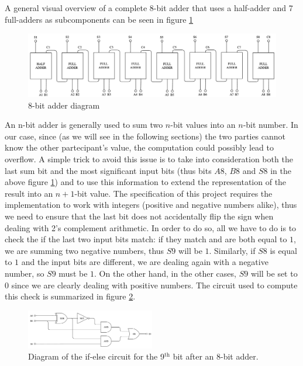\documentclass[12pt]{article}
\begin{document}
A general visual overview of a complete 8-bit adder that uses a half-adder and 7 full-adders as subcomponents can be seen in figure \ref{fig:adder} 

\begin{figure}[h]
  \centering
  \includegraphics[width=\textwidth]{adder.png}
  \caption{8-bit adder diagram}\label{fig:adder}
\end{figure}

An n-bit adder is generally used to sum two $n$-bit values into an $n$-bit number. In our case, since (as we will see in the following sections) the two parties cannot know the other partecipant's value, the computation could possibly lead to overflow. A simple trick to avoid this issue is to take into consideration both the last sum bit and the most significant input bits (thus bits $A8$, $B8$ and $S8$ in the above figure \ref{fig:adder}) and to use this information to extend the representation of the result into an $n+1$-bit value. The specification of this project requires the implementation to work with integers (positive and negative numbers alike), thus we need to ensure that the last bit does not accidentally flip the sign when dealing with 2's complement arithmetic. In order to do so, all we have to do is to check the if the last two input bits match: if they match and are both equal to $1$, we are summing two negative numbers, thus $S9$ will be $1$. Similarly, if $S8$ is equal to $1$ and the input bits are different, we are dealing again with a negative number, so $S9$ must be $1$. On the other hand, in the other cases, $S9$ will be set to $0$ since we are clearly dealing with positive numbers. The circuit used to compute this check is summarized in figure \ref{fig:overflow}.

\begin{figure}[t]
  \centering
  \includegraphics[width=0.5\textwidth]{overflow.png}
  \caption{Diagram of the if-else circuit for the 9$^{\textrm{th}}$ bit after an 8-bit adder.}\label{fig:overflow}
\end{figure}
\end{document}
